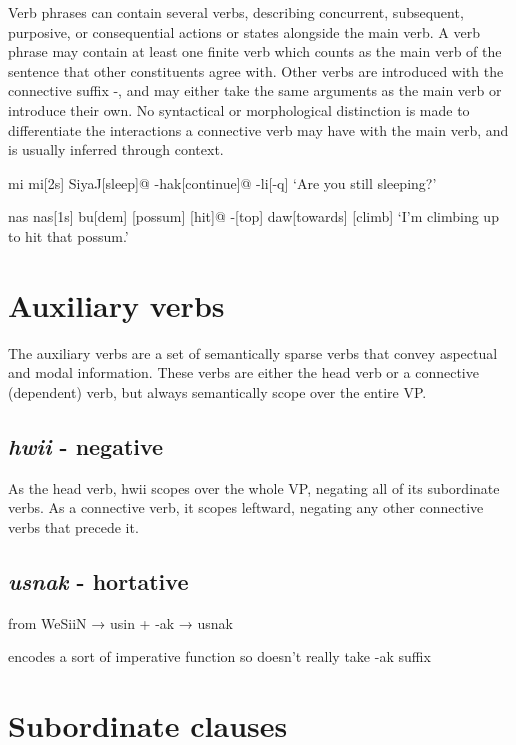 Verb phrases can contain several verbs, describing concurrent, subsequent, purposive, or consequential actions or states alongside the main verb. A verb phrase may contain at least one finite verb which counts as the main verb of the sentence that other constituents agree with. Other verbs are introduced with the connective suffix -\lilglot{}, and may either take the same arguments as the main verb or introduce their own. No syntactical or morphological distinction is made to differentiate the interactions a connective verb may have with the main verb, and is usually inferred through context. 

\ex
\begingl
\glpreamble
mi 
\endpreamble
mi[\sc 2s]
SiyaJ[sleep]@
-\lilglot[\sc -cvb]
hak[continue]@
-li[\sc -q]
\glft `Are you still sleeping?'
\endgl
\xe

\ex
\begingl
\glpreamble
nas 
\endpreamble
nas[\sc 1s]
bu[\sc dem]
[possum]
[hit]@
-\lilglot[\sc cvb]
[top]
daw[towards]
[climb]
\glft `I'm climbing up to hit that possum.'
\endgl
\xe

\section{Auxiliary verbs}

The auxiliary verbs are a set of semantically sparse verbs that convey aspectual and modal information. These verbs are either the head verb or a connective (dependent) verb, but always semantically scope over the entire VP.

\subsection{\emph{hwii} - negative}

As the head verb, hwii scopes over the whole VP, negating all of its subordinate verbs. As a connective verb, it scopes leftward, negating any other connective verbs that precede it.

\subsection{\emph{usnak} - hortative}

from WeSiiN → usin + -ak → usnak

encodes a sort of imperative function so doesn't really take -ak suffix

\section{Subordinate clauses}

